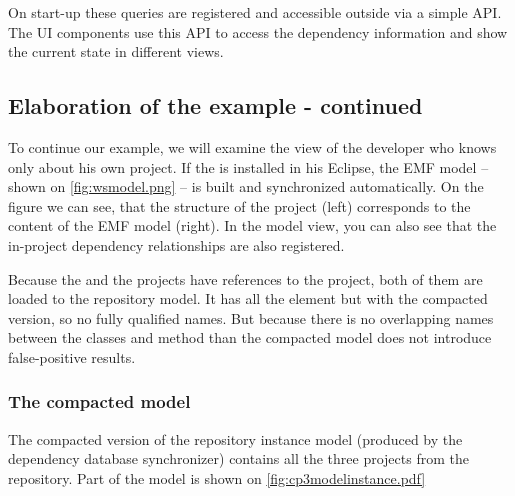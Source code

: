 
On start-up these queries are registered and accessible outside via a simple API.
The UI components use this API to access the dependency information and show the
current state in different views.


\subsection{Elaboration of the example - continued}
To continue our example, we will examine the view of the developer who knows
only about his own  project. If the \ptool{} is  installed in his
Eclipse, the EMF model -- shown on \autoref{fig:wsmodel.png}
-- is built and synchronized automatically. On the figure we can see, that the
structure of the project (left) corresponds to the content of the EMF model
(right). In the model view, you can also see that the in-project dependency
relationships are also registered.

Because the  and the  projects have references to the
 project, both of them are loaded to the repository model. It has all the
element but with the compacted version, so no fully qualified names. But because
there is no overlapping names between the classes and method than the compacted
model does not introduce false-positive results.


\subsubsection{The compacted model}
The compacted version of the repository instance model (produced by the
dependency database synchronizer) contains all the three projects from the
repository. Part of the model is shown on
\autoref{fig:cp3modelinstance.pdf} 


